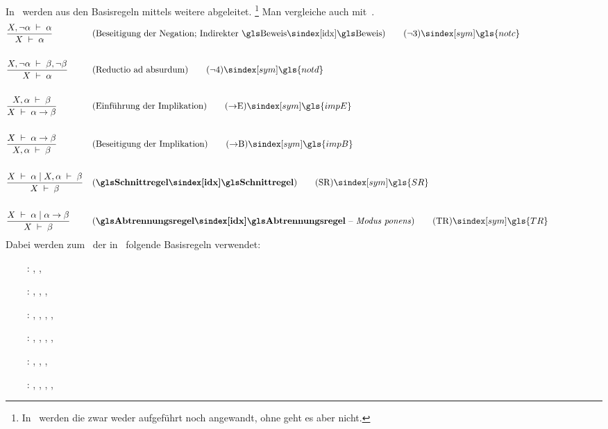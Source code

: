 {In~\cite{bib:Rautenberg} werden aus den Basisregeln mittels  weitere  abgeleitet.%
\footnote{%
	In~\cite{bib:Rautenberg} werden die  zwar weder aufgeführt noch angewandt, ohne  geht es aber nicht.
}
Man vergleiche auch mit~\cite{bib:NatuerlichesSchliessen}.
%
\begin{align}
	& \frac{X,\lnot\alpha\derive\alpha}{X\derive\alpha}
	& & (\text{Beseitigung der Negation; Indirekter \Beweis})
	\tag{\tagnotc} \sym{\gls{notc}} \label{def:notc}
	\\\\
	& \frac{X,\lnot\alpha\derive\beta,\lnot\beta}{X\derive\alpha}
	& & (\text{Reductio ad absurdum})
	\tag{\tagnotd} \sym{\gls{notd}} \label{def:notd}
	\\\\
	& \frac{X,\alpha\derive\beta}{X\derive\alpha\limp\beta}
	& & (\text{Einführung der Implikation})
	\tag{\tagimpE} \sym{\gls{impE}} \label{def:impE}
	\\\\
	& \frac{X\derive\alpha\limp\beta}{X,\alpha\derive\beta}
	& & (\text{Beseitigung der Implikation})
	\tag{\tagimpB} \sym{\gls{impB}} \label{def:impB}
	\\\\
	& \frac{X\derive\alpha \srand X,\alpha\derive\beta}{X\derive\beta}
	& & (\text{\defn{\glsIdx{Schnittregel}}})
	\tag{\tagSR} \sym{\gls{SR}} \label{def:SR}
	\\\\
	& \frac{X\derive\alpha \srand \alpha\limp\beta}{X\derive\beta}
	& & (\text{\defn{\glsIdx{Abtrennungsregel}} -- \emph{Modus ponens}})
	\tag{\tagTR} \sym{\gls{TR}} \label{def:TR}
	\formulatoleft
\end{align}
%
Dabei werden zum \Beweis\ der  in~\cite{bib:Rautenberg} folgende Basisregeln verwendet:
\begin{itemize}
	\renewcommand*{\itemindent}{1cm}
	\renewcommand*{\labelsep}{5pt}
	\item[\tagnotc~:] \tagAR, \tagMR,           \tagnotb
	\item[\tagnotd~:] \tagAR, \tagMR, \tagnota, \tagnotb
	\item[\tagimpE~:] \tagAR, \tagMR, \tagnota, \tagnotb, \tagandE
	\item[\tagimpB~:] \tagAR, \tagMR, \tagnota, \tagnotb          , \tagandB
	\item[\tagSR  ~:] \tagAR, \tagMR, \tagnota, \tagnotb
	\item[\tagTR  ~:] \tagAR, \tagMR, \tagnota, \tagnotb, \tagandE
\end{itemize}
%
}
